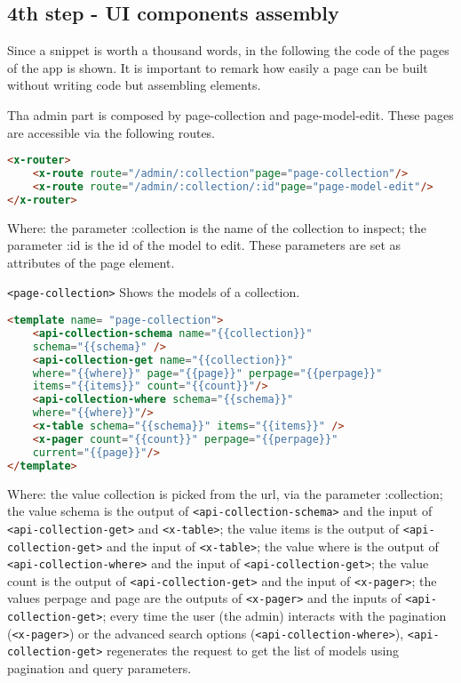 \subsection{4th step - UI components assembly}

Since a snippet is worth a thousand words, in the following the code of the pages of the app is shown. It is important to remark how easily a page can be built without writing code but assembling elements.

Tha admin part is composed by page-collection and page-model-edit. These pages are accessible via the following routes.

\begin{lstlisting}[language=html]
<x-router>
	<x-route route="/admin/:collection"page="page-collection"/>
	<x-route route="/admin/:collection/:id"page="page-model-edit"/>
</x-router>
\end{lstlisting}

Where: the parameter :collection is the name of the collection to inspect; the parameter :id is the id of the model to edit. These parameters are set as attributes of the page element.

\begin{itemize} \texttt{<page-collection>} Shows the models of a collection.

\begin{lstlisting}[language=html]
<template name= "page-collection">
	<api-collection-schema name="{{collection}}" 
	schema="{{schema}" />
	<api-collection-get name="{{collection}}" 
	where="{{where}}" page="{{page}}" perpage="{{perpage}}"
	items="{{items}}" count="{{count}}"/>
	<api-collection-where schema="{{schema}}" 
	where="{{where}}"/>
	<x-table schema="{{schema}}" items="{{items}}" />
	<x-pager count="{{count}}" perpage="{{perpage}}" 
	current="{{page}}"/>
</template>
\end{lstlisting}

Where: the value collection is picked from the url, via the parameter :collection; the value schema is the output of \texttt{<api-collection-schema>} and the input of \texttt{<api-collection-get>} and \texttt{<x-table>}; the value items is the output of \texttt{<api-collection-get>} and the input of \texttt{<x-table>}; the value where is the output of \texttt{<api-collection-where>} and the input of \texttt{<api-collection-get>}; the value count is the output of \texttt{<api-collection-get>} and the input of \texttt{<x-pager>}; the values perpage and page are the outputs of \texttt{<x-pager>} and the inputs of \texttt{<api-collection-get>}; every time the user (the admin) interacts with the pagination (\texttt{<x-pager>}) or the advanced search options (\texttt{<api-collection-where>}), \texttt{<api-collection-get>} regenerates the request to get the list of models using pagination and query parameters.

\end{itemize}


